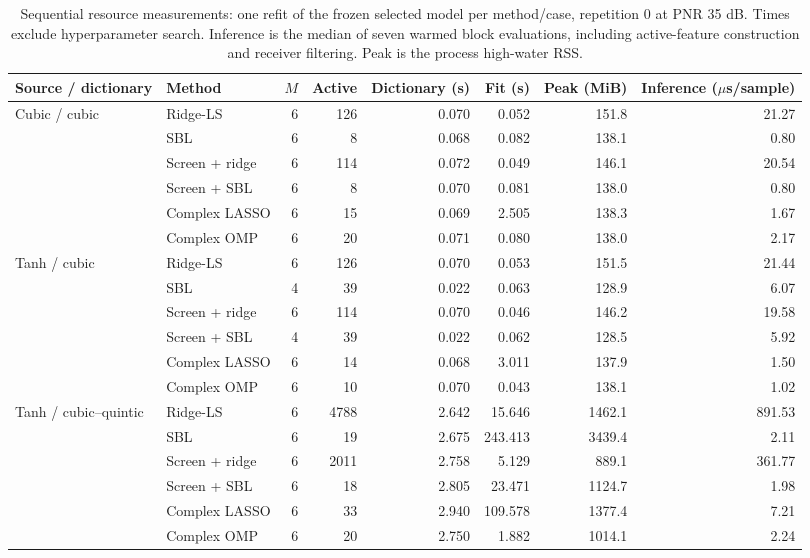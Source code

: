 \begin{table}[!t]
\caption{Sequential resource measurements: one refit of the frozen selected model per method/case, repetition 0 at PNR 35 dB. Times exclude hyperparameter search. Inference is the median of seven warmed block evaluations, including active-feature construction and receiver filtering. Peak is the process high-water RSS.}
\label{tab:resources}\centering\scriptsize\setlength{\tabcolsep}{3pt}
\begin{tabular}{llrrrrrr}\toprule
Source / dictionary & Method & $M$ & Active & Dictionary (s) & Fit (s) & Peak (MiB) & Inference ($\mu$s/sample)\\\midrule
Cubic / cubic & Ridge-LS & 6 & 126 & 0.070 & 0.052 & 151.8 & 21.27\\
 & SBL & 6 & 8 & 0.068 & 0.082 & 138.1 & 0.80\\
 & Screen + ridge & 6 & 114 & 0.072 & 0.049 & 146.1 & 20.54\\
 & Screen + SBL & 6 & 8 & 0.070 & 0.081 & 138.0 & 0.80\\
 & Complex LASSO & 6 & 15 & 0.069 & 2.505 & 138.3 & 1.67\\
 & Complex OMP & 6 & 20 & 0.071 & 0.080 & 138.0 & 2.17\\
\midrule
Tanh / cubic & Ridge-LS & 6 & 126 & 0.070 & 0.053 & 151.5 & 21.44\\
 & SBL & 4 & 39 & 0.022 & 0.063 & 128.9 & 6.07\\
 & Screen + ridge & 6 & 114 & 0.070 & 0.046 & 146.2 & 19.58\\
 & Screen + SBL & 4 & 39 & 0.022 & 0.062 & 128.5 & 5.92\\
 & Complex LASSO & 6 & 14 & 0.068 & 3.011 & 137.9 & 1.50\\
 & Complex OMP & 6 & 10 & 0.070 & 0.043 & 138.1 & 1.02\\
\midrule
Tanh / cubic--quintic & Ridge-LS & 6 & 4788 & 2.642 & 15.646 & 1462.1 & 891.53\\
 & SBL & 6 & 19 & 2.675 & 243.413 & 3439.4 & 2.11\\
 & Screen + ridge & 6 & 2011 & 2.758 & 5.129 & 889.1 & 361.77\\
 & Screen + SBL & 6 & 18 & 2.805 & 23.471 & 1124.7 & 1.98\\
 & Complex LASSO & 6 & 33 & 2.940 & 109.578 & 1377.4 & 7.21\\
 & Complex OMP & 6 & 20 & 2.750 & 1.882 & 1014.1 & 2.24\\
\bottomrule\end{tabular}\end{table}
